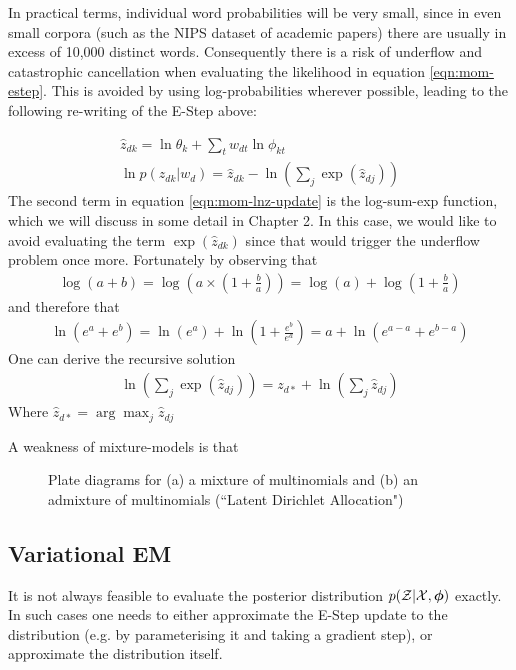 In practical terms, individual word probabilities will be very small, since in even small corpora (such as the NIPS dataset of academic papers) there are usually in excess of 10,000 distinct words. Consequently there is a risk of underflow and catastrophic cancellation when evaluating the likelihood in equation \eqref{eqn:mom-estep}. This is avoided by using log-probabilities wherever possible, leading to the following re-writing of the E-Step above:

\begin{align}
\hat{z}_{dk} = \ln \theta_k + \sum_t w_{dt} \ln \phi_{kt} \\
\ln p(z_{dk} | w_d) = \hat{z}_{dk} - \ln (\sum_j \exp(\hat{z}_{dj})) \label{eqn:mom-lnz-update}
\end{align}
The second term in equation \eqref{eqn:mom-lnz-update} is the log-sum-exp function, which we will discuss in some detail in Chapter 2. In this case, we would like to avoid evaluating the term $\exp(\hat{z}_{dk})$ since that would trigger the underflow problem once more. Fortunately by observing that
\begin{align}
\log(a + b) = \log(a \times (1 + \frac{b}{a})) = \log(a) + \log (1 + \frac{b}{a})
\end{align}
and therefore that
\begin{align}
\ln(e^a + e^b) = \ln (e^a) + \ln (1 + \frac{e^b}{e^a}) = a + \ln(e^{a-a} + e^{b-a})
\end{align}
One can derive the recursive solution
\begin{align}
\ln(\sum_j \exp(\hat{z}_{dj})) = z_{d*} + \ln(\sum_j \hat{z}_{dj})
\end{align}
Where $\hat{z}_{d*} = \arg \max_j \hat{z}_{dj}$

A weakness of mixture-models is that 

\begin{figure}
\centering
    \subfigure[]{
        \resizebox{0.4\textwidth}{0.20\textwidth}{
            
        }
    }
    \subfigure[]{
        \resizebox{0.4\textwidth}{0.20\textwidth}{
            
        }
    }

    \caption{Plate diagrams for (a) a mixture of multinomials and (b) an admixture of multinomials (``Latent Dirichlet Allocation")}
\label{fig:plates}
\end{figure}


\subsection{Variational EM}
It is not always feasible to evaluate the posterior distribution $p({ \mathcal{Z} }|{ \mathcal{X} }, { \bm \phi })$ exactly. In such cases one needs to either approximate the E-Step update to the distribution (e.g. by parameterising it and taking a gradient step), or approximate the distribution itself.

